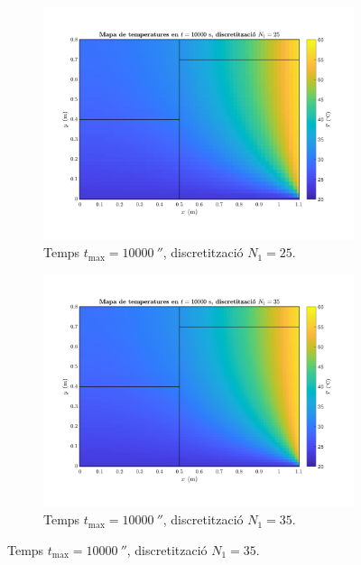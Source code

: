 \begin{figure}[ht]
\begin{subfigure}{.5\textwidth}
	\end{subfigure}
	\begin{subfigure}{.5\textwidth}
		\centering
		\includegraphics[width=.95\linewidth]{imagenes/04_analisi_influencia_dades_numeriques/malla/malla_9.pdf}
		\vspace{-15pt}
		\caption{Temps $t_\text{max} = 10000 \ \second$, discretització $N_1 = 25$.}
		\label{fig:malla_9}
	\end{subfigure}%
	\begin{subfigure}{.5\textwidth}
		\centering
		\includegraphics[width=.95\linewidth]{imagenes/04_analisi_influencia_dades_numeriques/malla/malla_10.pdf}
		\vspace{-15pt}
		\caption{Temps $t_\text{max} = 10000 \ \second$, discretització $N_1 = 35$.}
		\label{fig:malla_10}
	\end{subfigure}

\end{figure}
